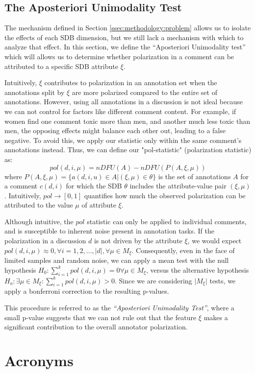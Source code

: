 \documentclass{article}
\begin{document}
\subsection{The Aposteriori Unimodality Test}
\label{ssec:methodology:aposteriori}

The mechanism defined in Section \ref{ssec:methodology:problem} allows us to isolate the effects of each \ac{SDB} dimension, but we still lack a mechanism with which to analyze that effect. In this section, we define the ``Aposteriori Unimodality test'' which will allows us to determine whether polarization in a comment can be attributed to a specific \ac{SDB} attribute $\xi$.

Intuitively, $\xi$ contributes to polarization in an annotation set when the annotations split by  $\xi$ are more polarized compared to the entire set of annotations. However, using all annotations in a discussion is not ideal because we can not control for factors like different comment content. For example, if women find one comment toxic more than men, and another much less toxic than men, the opposing effects might balance each other out, leading to a false negative. To avoid this, we apply our statistic only within the same comment’s annotations instead. Thus, we can define our "pol-statistic" (polarization statistic) as:
\begin{equation}
	pol(d, i, \mu) = nDFU(A) - nDFU(P(A, \xi, \mu))
\end{equation}
\noindent where $P(A,\xi, \mu) = \{a(d, i, u) \in A | (\xi, \mu) \in \theta\}$ is the set of annotations $A$ for a comment $c(d, i)$ for which the \ac{SDB} $\theta$ includes the attribute-value pair $(\xi, \mu)$.  Intuitively, $pol \rightarrow [0,1]$ quantifies how much the observed polarization can be attributed to the value $\mu$ of attribute $\xi$.

Although intuitive, the $pol$ statistic can only be applied to individual comments, and is susceptible to inherent noise present in annotation tasks. If the polarization in a discussion $d$ is not driven by the attribute $\xi$, we would expect $pol(d, i, \mu) \approx 0, \forall i=1, 2, \ldots, \lvert d \rvert, \forall \mu \in M_{\xi}$. Consequently, even in the face of limited samples and random noise, we can apply a mean test with the null hypothesis $H_0: \sum_{i=1}^k pol(d, i, \mu) = 0 \forall \mu \in M_{\xi}$, versus the alternative hypothesis $H_a: \exists \mu \in M_{\xi}: \sum_{i=1}^k pol(d, i, \mu) > 0$. Since we are considering $\lvert M_{\xi} \rvert$ tests, we apply a bonferroni correction to the resulting p-values.

This procedure is referred to as the \textit{``Aposteriori Unimodality Test''}, where a small p-value suggests that we can not rule out that the feature $\xi$ makes a significant contribution to the overall annotator polarization.


\section{Acronyms}

\begin{acronym}[WWW]
\end{acronym}
\end{document}
